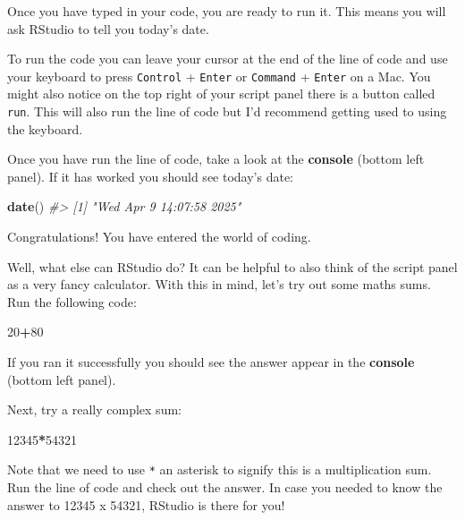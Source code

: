 \documentclass[
]{book}
\newenvironment{Shaded}{\begin{snugshade}}{\end{snugshade}}
\newcommand{\CommentTok}[1]{\textcolor[rgb]{0.56,0.35,0.01}{\textit{#1}}}
\newcommand{\DecValTok}[1]{\textcolor[rgb]{0.00,0.00,0.81}{#1}}
\newcommand{\FunctionTok}[1]{\textcolor[rgb]{0.13,0.29,0.53}{\textbf{#1}}}
\newcommand{\NormalTok}[1]{#1}
\newcommand{\SpecialCharTok}[1]{\textcolor[rgb]{0.81,0.36,0.00}{\textbf{#1}}}
\begin{document}
Once you have typed in your code, you are ready to run it. This means you will ask RStudio to tell you today's date.

To run the code you can leave your cursor at the end of the line of code and use your keyboard to press \texttt{Control} + \texttt{Enter} or \texttt{Command} + \texttt{Enter} on a Mac. You might also notice on the top right of your script panel there is a button called \texttt{run}. This will also run the line of code but I'd recommend getting used to using the keyboard.

\newpage

Once you have run the line of code, take a look at the \textbf{console} (bottom left panel). If it has worked you should see today's date:

\begin{Shaded}
\begin{Highlighting}[]
\FunctionTok{date}\NormalTok{()}
\CommentTok{\#\textgreater{} [1] "Wed Apr  9 14:07:58 2025"}
\end{Highlighting}
\end{Shaded}

Congratulations! You have entered the world of coding.

Well, what else can RStudio do? It can be helpful to also think of the script panel as a very fancy calculator. With this in mind, let's try out some maths sums. Run the following code:

\begin{Shaded}
\begin{Highlighting}[]
\DecValTok{20}\SpecialCharTok{+}\DecValTok{80}
\end{Highlighting}
\end{Shaded}

If you ran it successfully you should see the answer appear in the \textbf{console} (bottom left panel).

Next, try a really complex sum:

\begin{Shaded}
\begin{Highlighting}[]
\DecValTok{12345}\SpecialCharTok{*}\DecValTok{54321}
\end{Highlighting}
\end{Shaded}

Note that we need to use \texttt{*} an asterisk to signify this is a multiplication sum. Run the line of code and check out the answer. In case you needed to know the answer to 12345 x 54321, RStudio is there for you!
\end{document}

